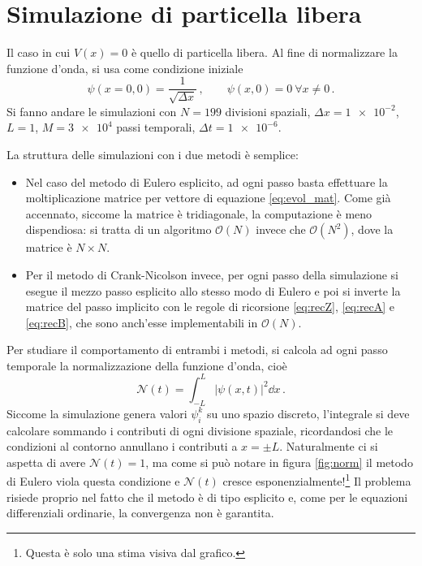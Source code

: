 \documentclass[a4paper, titlepage]{article}
\numberwithin{equation}{section}
\begin{document}
\section{Simulazione di particella libera}
Il caso in cui $V(x) = 0$ è quello di particella libera. Al fine di normalizzare la funzione d'onda, si usa come condizione iniziale
\begin{equation}
    \psi(x = 0, 0) = \frac{1}{\sqrt{\Delta x}}\, ,
    \qquad
    \psi(x,0) = 0\ \forall x \neq 0\, .
    \label{eq:initial}
\end{equation}
Si fanno andare le simulazioni con $N = 199$ divisioni spaziali, $\Delta x = \num{1e-2}$, $L=1$, $M = \num{3e4}$ passi temporali, $\Delta t = \num{1e-6}$. 

La struttura delle simulazioni con i due metodi è semplice:
\begin{itemize}
    \item Nel caso del metodo di Eulero esplicito, ad ogni passo basta effettuare la moltiplicazione matrice per vettore di equazione \eqref{eq:evol_mat}. Come già accennato, siccome la matrice è tridiagonale, la computazione è meno dispendiosa: si tratta di un algoritmo $\mathcal{O}(N)$ invece che $\mathcal{O}(N^2)$, dove la matrice è $N\times N$.
    \item Per il metodo di Crank-Nicolson invece, per ogni passo della simulazione si esegue il mezzo passo esplicito allo stesso modo di Eulero e poi si inverte la matrice del passo implicito con le regole di ricorsione \eqref{eq:recZ}, \eqref{eq:recA} e \eqref{eq:recB}, che sono anch'esse implementabili in $\mathcal{O}(N)$.
\end{itemize}

Per studiare il comportamento di entrambi i metodi, si calcola ad ogni passo temporale la normalizzazione della funzione d'onda, cioè
\[
    \mathcal{N}(t) = \int_{-L}^L |\psi(x,t)|^2 \dd{x}\, .
\]
Siccome la simulazione genera valori $\psi_i^k$ su uno spazio discreto, l'integrale si deve calcolare sommando i contributi di ogni divisione spaziale, ricordandosi che le condizioni al contorno annullano i contributi a $x = \pm L$.
Naturalmente ci si aspetta di avere $\mathcal{N}(t) = 1$, ma come si può notare in figura \ref{fig:norm} il metodo di Eulero viola questa condizione e $\mathcal{N}(t)$ cresce esponenzialmente!\footnote{Questa è solo una stima visiva dal grafico.}
Il problema risiede proprio nel fatto che il metodo è di tipo esplicito e, come per le equazioni differenziali ordinarie, la convergenza non è garantita. 
\end{document}

